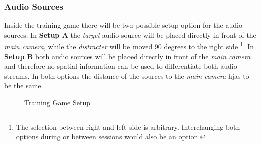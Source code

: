 \documentclass[a4paper,11pt]{article}%
\renewcommand{\\}{\vspace*{0.5\baselineskip} \newline}
\begin{document}
\subsubsection{Audio Sources}
Inside the training game there will be two possible setup option for the audio sources. In \textbf{Setup A} the \textit{target} audio source will be placed directly in front of the \textit{main camera}, while the \textit{distracter} will be moved 90 degrees to the right side \footnote{The selection between right and left side is arbitrary. Interchanging both options during or between sessions would also be an option.}. In \textbf{Setup B} both audio sources will be placed directly in front of the \textit{main camera} and therefore no spatial information can be used to differentiate both audio streams. In both options the distance of the sources to the \textit{main camera} hjas to be the same.
\begin{figure}[h!]
	\hspace{0.1\textwidth}
\caption{Training Game Setup}
\label{fig:setups}
\vspace{3mm}
\end{figure}
\end{document}

